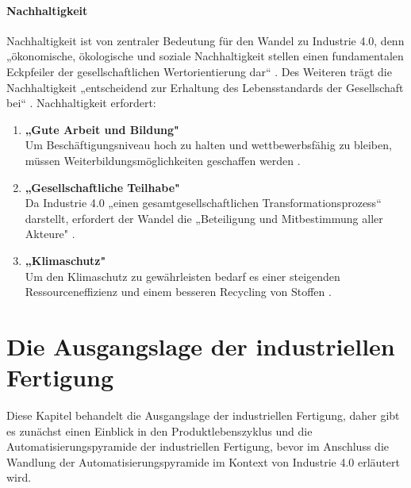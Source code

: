 \paragraph{Nachhaltigkeit}\label{sec:Nachhaltigkeit}
\noindent Nachhaltigkeit ist von zentraler Bedeutung für den Wandel zu Industrie 4.0, denn „ökonomische, ökologische und soziale Nachhaltigkeit stellen einen fundamentalen Eckpfeiler der gesellschaftlichen Wertorientierung dar“ \cite[S.6]{3}. Des Weiteren trägt die Nachhaltigkeit „entscheidend zur Erhaltung des Lebensstandards der Gesellschaft bei“ \cite[S.6]{3}.
Nachhaltigkeit erfordert:
\begin{enumerate}
	\item \textbf{„Gute Arbeit und Bildung"} \cite[S.6]{3} \\
	Um Beschäftigungsniveau hoch zu halten und wettbewerbsfähig zu bleiben, müssen
	Weiterbildungsmöglichkeiten geschaffen werden \cite[S.6]{3}.
	\item \textbf{„Gesellschaftliche Teilhabe"} \cite[S.6]{3} \\
	Da Industrie 4.0 „einen gesamtgesellschaftlichen Transformationsprozess“ \cite[S.6]{3} darstellt, erfordert der Wandel die „Beteiligung und Mitbestimmung aller Akteure" \cite[S.6]{3}.
	\item \textbf{„Klimaschutz"} \cite[S.6]{3} \\
	Um den Klimaschutz zu gewährleisten bedarf es einer steigenden Ressourceneffizienz
	und einem besseren Recycling von Stoffen \cite[S.6]{3}.
\end{enumerate}
\section{Die Ausgangslage der industriellen Fertigung}\label{sec:IndustrielleFertigung}
Diese Kapitel behandelt die Ausgangslage der industriellen Fertigung, daher gibt es zunächst einen Einblick in den Produktlebenszyklus und die Automatisierungspyramide der industriellen Fertigung, bevor im Anschluss die Wandlung der Automatisierungspyramide im Kontext von Industrie 4.0 erläutert wird.

